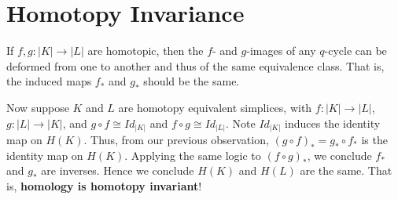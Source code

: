 \section{Homotopy Invariance}
If $f,g: |K| \to |L|$ are homotopic, then the $f$- and $g$-images of any $q$-cycle can be deformed from one to another and thus of the same equivalence class. That is, the induced maps $f_*$ and $g_*$ should be the same.

Now suppose $K$ and $L$ are homotopy equivalent simplices, with $f: |K| \to |L|$, $g: |L| \to |K|$, and $g \circ f \cong Id_{|K|}$ and $f \circ g \cong Id_{|L|}$. Note $Id_{|K|}$ induces the identity map on $H(K)$. Thus, from our previous observation, $(g \circ f)_* = g_* \circ f_*$ is the identity map on $H(K)$. Applying the same logic to $(f \circ g)_*$, we conclude $f_*$ and $g_*$ are inverses. Hence we conclude $H(K)$ and $H(L)$ are the same. That is, \textbf{homology is homotopy invariant}!